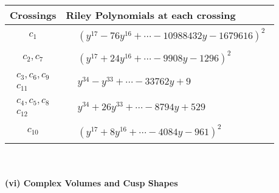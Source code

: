\documentclass[1p]{elsarticle_modified}
\theoremstyle{definition}
\begin{document}
\begin{tabular}{m{50pt}|m{274pt}}
Crossings & \hspace{64pt}Riley Polynomials at each crossing \\
\hline $$\begin{aligned}c_{1}\end{aligned}$$&$\begin{aligned}
&(y^{17}-76 y^{16}+\cdots-10988432 y-1679616)^{2}
\end{aligned}$\\
\hline $$\begin{aligned}c_{2},c_{7}\end{aligned}$$&$\begin{aligned}
&(y^{17}+24 y^{16}+\cdots-9908 y-1296)^{2}
\end{aligned}$\\
\hline $$\begin{aligned}c_{3},c_{6},c_{9}\\c_{11}\end{aligned}$$&$\begin{aligned}
&y^{34}- y^{33}+\cdots-33762 y+9
\end{aligned}$\\
\hline $$\begin{aligned}c_{4},c_{5},c_{8}\\c_{12}\end{aligned}$$&$\begin{aligned}
&y^{34}+26 y^{33}+\cdots-8794 y+529
\end{aligned}$\\
\hline $$\begin{aligned}c_{10}\end{aligned}$$&$\begin{aligned}
&(y^{17}+8 y^{16}+\cdots-4084 y-961)^{2}
\end{aligned}$\\
\hline
\end{tabular}\\~\\
\newpage\flushleft \textbf{(vi) Complex Volumes and Cusp Shapes}
\end{document}
